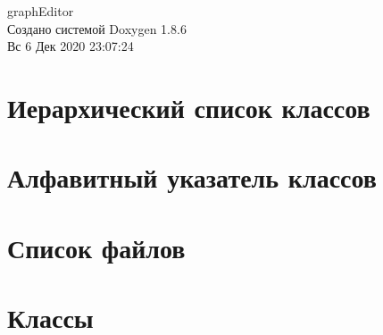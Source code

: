 \documentclass[twoside]{book}
\newcommand{\clearemptydoublepage}{%
  \newpage{\pagestyle{empty}\cleardoublepage}%
}
\begin{document}
\hypersetup{pageanchor=false}
\begin{titlepage}
\vspace*{7cm}
\begin{center}%
{\Large graph\-Editor }\\
\vspace*{1cm}
{\large Создано системой Doxygen 1.8.6}\\
\vspace*{0.5cm}
{\small Вс 6 Дек 2020 23:07:24}\\
\end{center}
\end{titlepage}
\clearemptydoublepage
\tableofcontents
\clearemptydoublepage
{}
\hypersetup{pageanchor=true}

\chapter{Иерархический список классов}

\chapter{Алфавитный указатель классов}

\chapter{Список файлов}

\chapter{Классы}



































\end{document}
